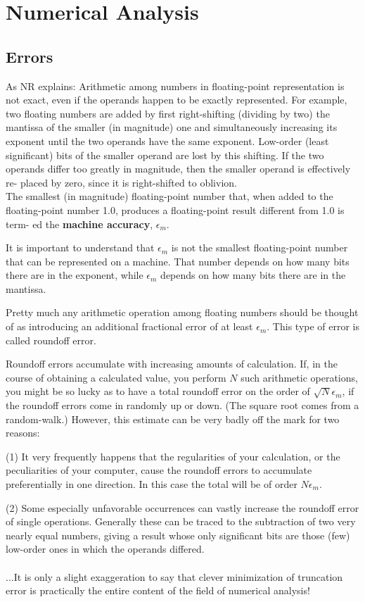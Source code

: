 \section{Numerical Analysis}

\subsection{Errors}

As NR explains: Arithmetic among numbers in floating-point representation is not exact, even if
the operands happen to be exactly represented.
For example, two floating numbers are added by first right-shifting
(dividing by two) the mantissa of the smaller (in magnitude) one and simultaneously
increasing its exponent until the two operands have the same exponent. Low-order
(least significant) bits of the smaller operand are lost by this shifting. If the two
operands differ too greatly in magnitude, then the smaller operand is effectively re-
placed by zero, since it is right-shifted to oblivion.
\\

The smallest (in magnitude) floating-point number that, when added to the
floating-point number 1.0, produces a floating-point result different from 1.0 is term-
ed the \textbf{machine accuracy}, $\epsilon_m$.

It is important to understand that $\epsilon_m$ is not the smallest floating-point number
that can be represented on a machine.
That number depends on how many bits there
are in the exponent, while $\epsilon_m$ depends on how many bits there are in the mantissa.


Pretty much any
arithmetic operation among floating numbers should be thought of as introducing an
additional fractional error of at least $\epsilon_m$.
This type of error is called roundoff error.

Roundoff errors accumulate with increasing amounts of calculation. If, in the
course of obtaining a calculated value, you perform $N$ such arithmetic operations,
you might be so lucky as to have a total roundoff error on the order of $\sqrt{N}\epsilon_m$, if
the roundoff errors come in randomly up or down. (The square root comes from
a random-walk.) However, this estimate can be very badly off the mark for two
reasons:

(1) It very frequently happens that the regularities of your calculation, or the
peculiarities of your computer, cause the roundoff errors to accumulate preferentially
in one direction. In this case the total will be of order $N\epsilon_m$.

(2) Some especially unfavorable occurrences can vastly increase the roundoff
error of single operations. Generally these can be traced to the subtraction of two
very nearly equal numbers, giving a result whose only significant bits are those (few)
low-order ones in which the operands differed.
\\~\\

...It is only a slight exaggeration to say that clever minimization of
truncation error is practically the entire content of the field of numerical analysis!
\\